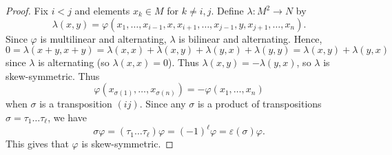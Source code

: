 \begin{proof}
  Fix $i < j$ and elements $x_k \in M$ for $k \ne i, j$.
  Define $\lambda : M^2 \to N$ by
  \[
    \lambda(x, y) = \varphi(x_1, \dots, x_{i-1}, x, x_{i+1}, \dots, x_{j-1}, y, x_{j+1}, \dots, x_n).
  \]
  Since $\varphi$ is multilinear and alternating,
  $\lambda$ is bilinear and alternating. Hence,
  \[
    0 = \lambda(x + y, x + y)
    = \lambda(x, x) + \lambda(x, y) + \lambda(y, x) + \lambda(y, y)
    = \lambda(x, y) + \lambda(y, x)
  \]
  since $\lambda$ is alternating (so $\lambda(x, x) = 0$).
  Thus $\lambda(x, y) = -\lambda(y, x)$, so
  $\lambda$ is skew-symmetric. Thus
  \[
    \varphi(x_{\sigma(1)}, \dots, x_{\sigma(n)})
    = - \varphi(x_1, \dots, x_n)
  \]
  when $\sigma$ is a transposition $(ij)$. Since
  any $\sigma$ is a product of transpositions
  $\sigma = \tau_1 \dots \tau_\ell$, we have
  \[
    \sigma \varphi = (\tau_1 \dots \tau_\ell) \varphi
    = (-1)^\ell \varphi = \varepsilon(\sigma) \varphi.
  \]
  This gives that $\varphi$ is skew-symmetric.
\end{proof}
